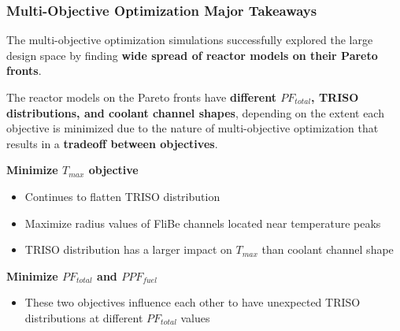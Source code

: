 \begin{frame}
    \frametitle{Multi-Objective Optimization Major Takeaways}
    The multi-objective optimization simulations successfully explored the large 
    design space by finding \textbf{wide spread of reactor models on their 
    Pareto fronts}. 

    \vspace{0.2cm}
    The reactor models on the Pareto fronts have \textbf{different $PF_{total}$, 
    TRISO distributions, and coolant channel shapes}, depending on the extent 
    each objective is minimized due to the nature of multi-objective
    optimization that results in a \textbf{tradeoff between objectives}. 

    \vspace{0.3cm}
    \textbf{Minimize $T_{max}$ objective} 
    \begin{itemize}
        \item Continues to flatten TRISO distribution 
        \item Maximize radius values of FliBe channels located near temperature peaks
        \item TRISO distribution has a larger impact on $T_{max}$ than coolant channel 
        shape  
    \end{itemize}

    \textbf{Minimize $PF_{total}$ and $PPF_{fuel}$} 
    \begin{itemize}
    \item These two objectives influence each other to have unexpected TRISO
    distributions at different $PF_{total}$ values
    \end{itemize} 

\end{frame}

